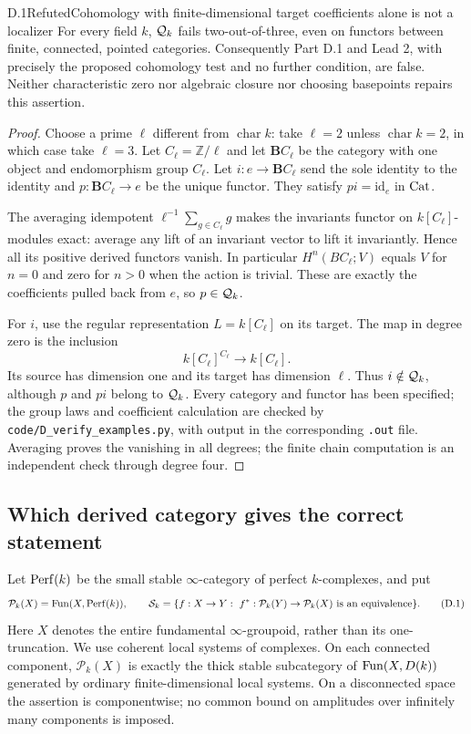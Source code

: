 \begin{claim}{D.1}{Refuted}{Cohomology with finite-dimensional target coefficients alone is not a localizer}
\label{D1}
For every field $k$, $\mathcal Q_k$ fails two-out-of-three, even on functors
between finite, connected, pointed categories. Consequently Part D.1 and
Lead 2, with precisely the proposed cohomology test and no further
condition, are false. Neither characteristic zero nor algebraic closure
nor choosing basepoints repairs this assertion.
\end{claim}
\begin{proof}
Choose a prime $\ell$ different from $\operatorname{char}k$: take
$\ell=2$ unless $\operatorname{char}k=2$, in which case take $\ell=3$.
Let $C_\ell=\mathbb Z/\ell$ and let $\mathbf B C_\ell$ be the category
with one object and endomorphism group $C_\ell$. Let
$i:e\to\mathbf B C_\ell$ send the sole identity to the identity and
$p:\mathbf B C_\ell\to e$ be the unique functor. They satisfy
$pi=\mathrm{id}_e$ in $\mathrm{Cat}$.

The averaging idempotent $\ell^{-1}\sum_{g\in C_\ell}g$ makes the
invariants functor on $k[C_\ell]$-modules exact: average any lift of an
invariant vector to lift it invariantly. Hence all its positive derived
functors vanish. In particular $H^n(BC_\ell;V)$ equals $V$ for $n=0$
and zero for $n>0$ when the action is trivial. These are exactly the
coefficients pulled back from $e$, so $p\in\mathcal Q_k$.

For $i$, use the regular representation $L=k[C_\ell]$ on its target.
The map in degree zero is the inclusion
\[
 k[C_\ell]^{C_\ell}\longrightarrow k[C_\ell].
\]
Its source has dimension one and its target has dimension $\ell$.
Thus $i\notin\mathcal Q_k$, although $p$ and $pi$ belong to $\mathcal Q_k$.
Every category and functor has been specified; the group laws and
coefficient calculation are checked by
\texttt{code/D\_verify\_examples.py}, with output in the corresponding
\texttt{.out} file. Averaging proves the vanishing in all degrees; the
finite chain computation is an independent check through degree four.
\end{proof}

\subsection{Which derived category gives the correct statement}

Let $\operatorname{Perf}(k)$ be the small stable $\infty$-category of perfect
$k$-complexes, and put
\[
 \mathcal P_k(X)=\operatorname{Fun}(X,\operatorname{Perf}(k)),
 \qquad
 \mathcal S_k=\{f:X\to Y:\ f^*:\mathcal P_k(Y)\to\mathcal P_k(X)
                       \text{ is an equivalence}\}.
 \tag{D.1}
\]
Here $X$ denotes the entire fundamental $\infty$-groupoid, rather than
its one-truncation. We use coherent local systems of complexes. On each
connected component, $\mathcal P_k(X)$ is exactly the thick stable
subcategory of $\operatorname{Fun}(X,D(k))$ generated by ordinary finite-dimensional
local systems. On a disconnected space the assertion is componentwise;
no common bound on amplitudes over infinitely many components is imposed.

